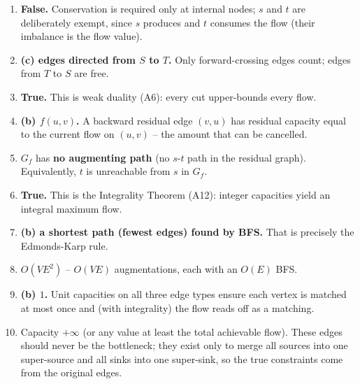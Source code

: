 \documentclass[11pt]{article}
\begin{document}
\begin{enumerate}[label=\textbf{B\arabic*.}, leftmargin=2.2em]

\item \textbf{False.} Conservation is required only at internal nodes; $s$ and $t$ are
deliberately exempt, since $s$ produces and $t$ consumes the flow (their imbalance is the
flow value).

\item \textbf{(c) edges directed from $S$ to $T$.} Only forward-crossing edges count;
edges from $T$ to $S$ are free.

\item \textbf{True.} This is weak duality (A6): every cut upper-bounds every flow.

\item \textbf{(b) $f(u,v)$.} A backward residual edge $(v,u)$ has residual capacity equal
to the current flow on $(u,v)$ -- the amount that can be cancelled.

\item $G_f$ has \textbf{no augmenting path} (no $s$-$t$ path in the residual graph).
Equivalently, $t$ is unreachable from $s$ in $G_f$.

\item \textbf{True.} This is the Integrality Theorem (A12): integer capacities yield an
integral maximum flow.

\item \textbf{(b) a shortest path (fewest edges) found by BFS.} That is precisely the
Edmonds-Karp rule.

\item $O(VE^2)$ -- $O(VE)$ augmentations, each with an $O(E)$ BFS.

\item \textbf{(b) $1$.} Unit capacities on all three edge types ensure each vertex is
matched at most once and (with integrality) the flow reads off as a matching.

\item Capacity $+\infty$ (or any value at least the total achievable flow). These edges
should never be the bottleneck; they exist only to merge all sources into one super-source
and all sinks into one super-sink, so the true constraints come from the original edges.

\end{enumerate}
\end{document}
